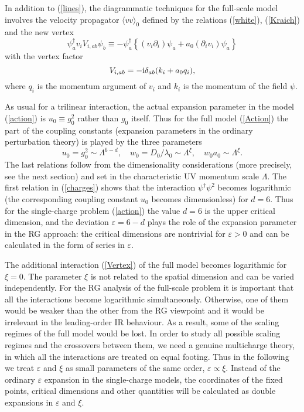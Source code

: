 \documentclass[12pt]{iopart}
\begin{document}
In addition to (\ref{lines}), the diagrammatic techniques for the
full-scale model involves the velocity propagator $\langle vv \rangle_{0}$
defined by the relations (\ref{white}), (\ref{Kraich}) and the
new vertex
\begin{equation}
\psi_{a}^{\dag} v_{i} V_{i,ab} \psi_{b} \equiv
- \psi_{a}^{\dag}\left\{
(v_{i}\partial_{i}) \psi_{a} + a_{0}(\partial_{i}v_{i}) \psi_{a} \right\}
\label{Vertex}
\end{equation}
with the vertex factor
\begin{equation}
V_{i,ab} = - {\rm i} \delta_{ab} (k_{i}+ a_{0} q_{i}),
\label{VertexF}
\end{equation}
where $q_{i}$ is the momentum argument of $v_{i}$ and
$k_{i}$ is the momentum of the field $\psi$.


As usual for a trilinear interaction, the actual expansion parameter
in the model (\ref{action}) is $u_{0}\equiv g_{0}^2$
rather than $g_{0}$ itself. Thus for the full model (\ref{Action}) the part
of the coupling constants (expansion parameters in the ordinary perturbation
theory) is played by the three parameters
\begin{equation}
u_{0}=g_{0}^2  \sim \Lambda^{6-d}, \quad w_{0} =
D_{0}/\lambda_{0} \sim \Lambda^{\xi}, \quad w_{0}a_{0} \sim
\Lambda^{\xi}.
\label{charges}
\end{equation}
The last relations follow from the dimensionality considerations (more
precisely, see the next section) and set in the characteristic UV momentum
scale $\Lambda$. The first relation in (\ref{charges}) shows
that the interaction $\psi^{\dagger}\psi^{2}$ becomes logarithmic
(the corresponding coupling constant $u_{0}$ becomes dimensionless) for
$d=6$. Thus for the single-charge problem (\ref{action}) the value
$d=6$ is the upper critical dimension, and the deviation $\varepsilon=6-d$
plays the role of the expansion parameter in the RG approach:
the critical dimensions are nontrivial for $\varepsilon>0$ and can be
calculated in the form of series in $\varepsilon$.

The additional interaction (\ref{Vertex}) of the full model becomes
logarithmic for $\xi=0$. The parameter $\xi$ is not related to the spatial
dimension and can be varied independently. For the RG analysis of the
full-scale problem it is important that all the interactions become
logarithmic simultaneously. Otherwise, one of them would be weaker than
the other from the RG viewpoint and it would be irrelevant in the
leading-order IR behaviour. As a result, some of the scaling regimes
of the full model would be lost. In order to study all possible scaling
regimes and the crossovers between them, we need a genuine multicharge
theory, in which all the interactions are treated on equal footing. Thus
in the following we treat $\varepsilon$ and $\xi$ as small parameters of
the same order, $\varepsilon \propto \xi$. Instead of the ordinary
$\varepsilon$ expansion in the single-charge models, the coordinates
of the fixed points, critical dimensions and other quantities will be
calculated as double expansions in $\varepsilon$ and $\xi$.
\end{document}
